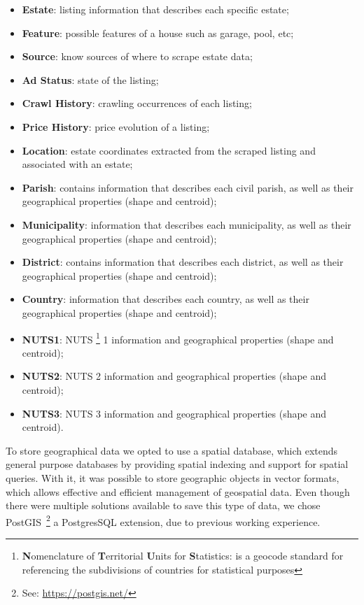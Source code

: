 \begin{itemize}
    \item \textbf{Estate}: listing information that describes each specific estate;
    \item \textbf{Feature}: possible features of a house such as garage, pool, etc;
    \item \textbf{Source}: know sources of where to scrape estate data;
    \item \textbf{Ad Status}: state of the listing;
    \item \textbf{Crawl History}: crawling occurrences of each listing;
    \item \textbf{Price History}: price evolution of a listing;
    \item \textbf{Location}: estate coordinates extracted from the scraped listing and associated with an estate;
    \item \textbf{Parish}: contains information that describes each civil parish, as well as their geographical properties (shape and centroid);
    \item \textbf{Municipality}: information that describes each municipality, as well as their geographical properties (shape and centroid);
    \item \textbf{District}: contains information that describes each district, as well as their geographical properties (shape and centroid);
    \item \textbf{Country}: information that describes each country, as well as their geographical properties (shape and centroid);
    \item \textbf{NUTS1}: NUTS \footnote{\textbf{N}omenclature of \textbf{T}erritorial \textbf{U}nits for \textbf{S}tatistics: is a geocode standard for referencing the subdivisions of countries for statistical purposes} 1 information and geographical properties (shape and centroid);
    \item \textbf{NUTS2}: NUTS 2 information and geographical properties (shape and centroid);
    \item \textbf{NUTS3}: NUTS 3 information and geographical properties (shape and centroid).
\end{itemize}

To store geographical data we opted to use a spatial database, which extends general purpose databases by providing spatial indexing and support for spatial queries. With it, it was possible to store geographic objects in vector formats, which allows effective and efficient management of geospatial data. Even though there were multiple solutions available to save this type of data, we chose PostGIS~\footnote{See: \url{https://postgis.net/}} a PostgresSQL extension, due to previous working experience.

